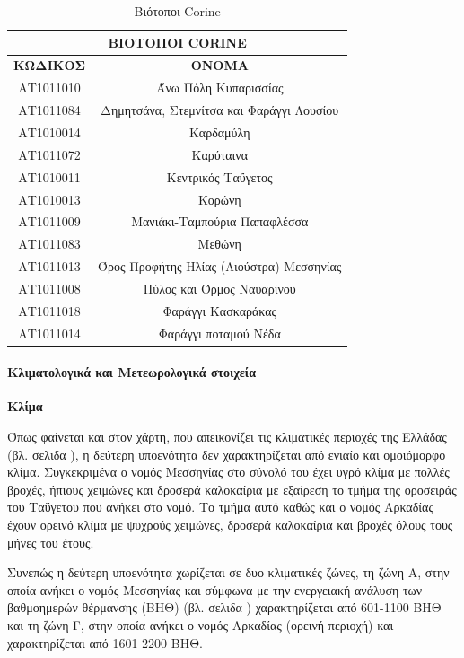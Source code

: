 \documentclass[12pt]{article}
\newcommand{\gr}{\selectlanguage{greek}}
\newcommand{\eng}{\selectlanguage{english}}
\begin{document}
	\begin{table}[H]
		\centering
		\begin{tabular}{|c||c|}
			\hline
			\multicolumn{2}{|c|}{\textbf{ΒΙΟΤΟΠΟΙ \eng CORINE \gr}} \\ \hline
			\textbf{ΚΩΔΙΚΟΣ} & \textbf{ΟΝΟΜΑ} \\ \hline
			ΑΤ1011010 & Άνω Πόλη Κυπαρισσίας \\ \hline
			ΑΤ1011084 & Δημητσάνα, Στεμνίτσα και Φαράγγι Λουσίου \\ \hline
			ΑΤ1010014 & Καρδαμύλη \\ \hline
			ΑΤ1011072 & Καρύταινα \\ \hline
			ΑΤ1010011 & Κεντρικός Ταΰγετος \\ \hline
			ΑΤ1010013 & Κορώνη \\ \hline
			ΑΤ1011009 & Μανιάκι-Ταμπούρια Παπαφλέσσα \\ \hline
			ΑΤ1011083 & Μεθώνη \\ \hline
			ΑΤ1011013 & Όρος Προφήτης Ηλίας (Λιούστρα) Μεσσηνίας \\ \hline
			ΑΤ1011008 & Πύλος και Όρμος Ναυαρίνου \\ \hline
			ΑΤ1011018 & Φαράγγι Κασκαράκας \\ \hline
			ΑΤ1011014 & Φαράγγι ποταμού Νέδα \\ \hline
		\end{tabular}
		\caption{Βιότοποι \eng Corine \gr}
		\label{The label}
	\end{table}
	
	\paragraph{Κλιματολογικά και Μετεωρολογικά στοιχεία}
	
	\textbf{Κλίμα}
	
	Όπως φαίνεται και στον χάρτη, που απεικονίζει τις κλιματικές περιοχές της Ελλάδας (βλ. σελιδα \pageref{klimatikes}), η δεύτερη υποενότητα δεν χαρακτηρίζεται από ενιαίο και ομοιόμορφο κλίμα. Συγκεκριμένα ο νομός Μεσσηνίας  στο σύνολό του έχει υγρό κλίμα με πολλές βροχές, ήπιους χειμώνες και δροσερά καλοκαίρια με εξαίρεση το τμήμα της οροσειράς του Ταΰγετου που ανήκει στο νομό. Το τμήμα αυτό καθώς και ο νομός Αρκαδίας έχουν ορεινό κλίμα με ψυχρούς χειμώνες, δροσερά καλοκαίρια και βροχές όλους τους μήνες του έτους. 
	
	Συνεπώς η δεύτερη υποενότητα χωρίζεται σε δυο κλιματικές ζώνες, τη ζώνη Α, στην οποία ανήκει ο νομός Μεσσηνίας και σύμφωνα με την ενεργειακή ανάλυση των βαθμοημερών θέρμανσης (ΒΗΘ) (βλ. σελιδα \pageref{bathmoimeres}) χαρακτηρίζεται από 601-1100 ΒΗΘ και τη ζώνη Γ, στην οποία ανήκει ο νομός Αρκαδίας (ορεινή περιοχή) και χαρακτηρίζεται από 1601-2200 ΒΗΘ.
	
\end{document}
